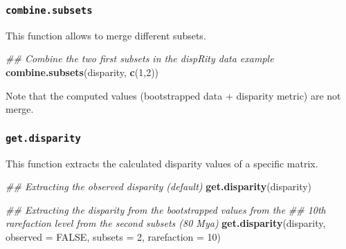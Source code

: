 \documentclass[
]{book}
\newenvironment{Shaded}{\begin{snugshade}}{\end{snugshade}}
\newcommand{\CommentTok}[1]{\textcolor[rgb]{0.56,0.35,0.01}{\textit{#1}}}
\newcommand{\DataTypeTok}[1]{\textcolor[rgb]{0.13,0.29,0.53}{#1}}
\newcommand{\DecValTok}[1]{\textcolor[rgb]{0.00,0.00,0.81}{#1}}
\newcommand{\KeywordTok}[1]{\textcolor[rgb]{0.13,0.29,0.53}{\textbf{#1}}}
\newcommand{\NormalTok}[1]{#1}
\newcommand{\OperatorTok}[1]{\textcolor[rgb]{0.81,0.36,0.00}{\textbf{#1}}}
\newcommand{\OtherTok}[1]{\textcolor[rgb]{0.56,0.35,0.01}{#1}}
\newcommand{\StringTok}[1]{\textcolor[rgb]{0.31,0.60,0.02}{#1}}
\begin{document}
\begin{Shaded}
\end{Shaded}

\hypertarget{combine.subsets}{%
\subsubsection{\texorpdfstring{\texttt{combine.subsets}}{combine.subsets}}\label{combine.subsets}}

This function allows to merge different subsets.

\begin{Shaded}
\begin{Highlighting}[]
\CommentTok{\#\# Combine the two first subsets in the dispRity data example}
\KeywordTok{combine.subsets}\NormalTok{(disparity, }\KeywordTok{c}\NormalTok{(}\DecValTok{1}\NormalTok{,}\DecValTok{2}\NormalTok{))}
\end{Highlighting}
\end{Shaded}

Note that the computed values (bootstrapped data + disparity metric) are not merge.

\hypertarget{get.disparity}{%
\subsubsection{\texorpdfstring{\texttt{get.disparity}}{get.disparity}}\label{get.disparity}}

This function extracts the calculated disparity values of a specific matrix.

\begin{Shaded}
\begin{Highlighting}[]
\CommentTok{\#\# Extracting the observed disparity (default)}
\KeywordTok{get.disparity}\NormalTok{(disparity)}

\CommentTok{\#\# Extracting the disparity from the bootstrapped values from the}
\CommentTok{\#\# 10th rarefaction level from the second subsets (80 Mya)}
\KeywordTok{get.disparity}\NormalTok{(disparity, }\DataTypeTok{observed =} \OtherTok{FALSE}\NormalTok{, }\DataTypeTok{subsets =} \DecValTok{2}\NormalTok{, }\DataTypeTok{rarefaction =} \DecValTok{10}\NormalTok{)}
\end{Highlighting}
\end{Shaded}
\end{document}
